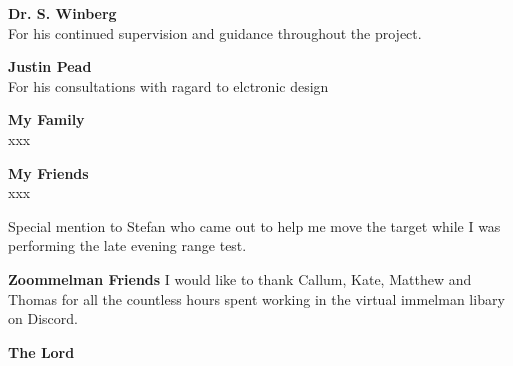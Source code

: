 \textbf{Dr. S. Winberg}\\
For his continued supervision and guidance throughout the project.

\textbf{Justin Pead}\\
For his consultations with ragard to elctronic design

\textbf{My Family}\\
xxx

\textbf{My Friends}\\
xxx

Special mention to Stefan who came out to help me move the target while I was performing the late evening range test.

\textbf{Zoommelman Friends}
I would like to thank Callum, Kate, Matthew and Thomas for all the countless hours spent working in the virtual immelman libary on Discord.


\textbf{The Lord}\\

